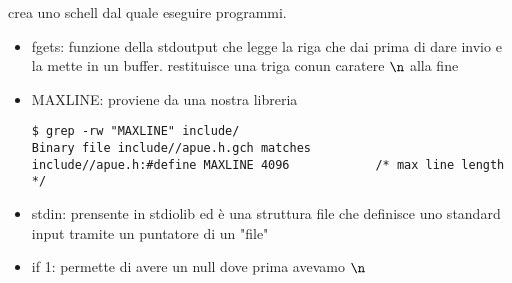 crea uno schell dal quale eseguire programmi.

\begin{itemize}
	\item fgets: funzione della stdoutput che legge la riga che dai prima di dare invio e la mette in un buffer. restituisce una triga conun caratere $\n$ alla fine
	\item MAXLINE: proviene da una nostra libreria

\begin{lstlisting}
$ grep -rw "MAXLINE" include/
Binary file include//apue.h.gch matches
include//apue.h:#define	MAXLINE	4096			/* max line length */
\end{lstlisting}

	\item stdin: prensente in stdiolib ed è una struttura file che definisce uno standard input tramite un puntatore di un "file"

	\item if 1: permette di avere un null dove prima avevamo $\n$
\end{itemize}